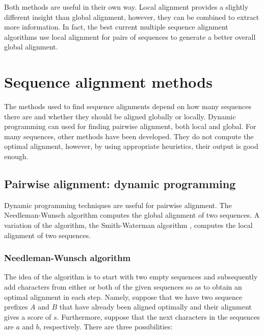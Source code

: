 Both methods are useful in their own way. Local alignment provides a slightly different insight than global alignment, however, they can
be combined to extract more information. In fact, the best current multiple sequence alignment algorithms use local alignment for pairs
of sequences to generate a better overall global alignment. \citep{msa_overview}

\section{Sequence alignment methods}

The methods used to find sequence alignments depend on how many sequences there are and whether they should be aligned globally or locally.
Dynamic programming can used for finding pairwise alignment, both local and global. For many sequences, other methods have been developed. They
do not compute the optimal alignment, however, by using appropriate heuristics, their output is good enough.

\subsection{Pairwise alignment: dynamic programming}

Dynamic programming techniques are useful for pairwise alignment. The Needleman-Wunsch algorithm \citep{needleman} computes the global alignment
of two sequences. A variation of the algorithm, the Smith-Waterman algorithm \citep{smith_waterman}, computes the local alignment of two sequences.

\subsubsection{Needleman-Wunsch algorithm}

The idea of the algorithm is to start with two empty sequences and subsequently add characters from either or both of the given sequences so as
to obtain an optimal alignment in each step. Namely, suppose that we have two sequence prefixes $A$ and $B$ that have already been aligned optimally
and their alignment gives a score of $s$. Furthermore, suppose that the next characters in the sequences are $a$ and $b$, respectively. There are
three possibilities:


